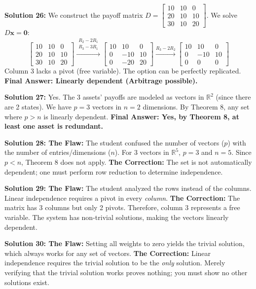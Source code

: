 \documentclass[12pt]{article}
\begin{document}
\textbf{Solution 26:} We construct the payoff matrix $D = \begin{bmatrix} 10 & 10 & 0 \\ 20 & 10 & 10 \\ 30 & 10 & 20 \end{bmatrix}$. We solve $D\mathbf{x} = \mathbf{0}$:
$$ \begin{bmatrix} 10 & 10 & 0 \\ 20 & 10 & 10 \\ 30 & 10 & 20 \end{bmatrix} \xrightarrow{\substack{R_2 - 2R_1 \\ R_3 - 3R_1}} \begin{bmatrix} 10 & 10 & 0 \\ 0 & -10 & 10 \\ 0 & -20 & 20 \end{bmatrix} \xrightarrow{R_3 - 2R_2} \begin{bmatrix} 10 & 10 & 0 \\ 0 & -10 & 10 \\ 0 & 0 & 0 \end{bmatrix} $$
Column 3 lacks a pivot (free variable). The option can be perfectly replicated. \textbf{Final Answer: Linearly dependent (Arbitrage possible).}

\textbf{Solution 27:} Yes. The 3 assets' payoffs are modeled as vectors in $\mathbb{R}^2$ (since there are 2 states). We have $p = 3$ vectors in $n = 2$ dimensions. By Theorem 8, any set where $p > n$ is linearly dependent. \textbf{Final Answer: Yes, by Theorem 8, at least one asset is redundant.}

\textbf{Solution 28: The Flaw:} The student confused the number of vectors ($p$) with the number of entries/dimensions ($n$). For 3 vectors in $\mathbb{R}^5$, $p=3$ and $n=5$. Since $p < n$, Theorem 8 does not apply. \textbf{The Correction:} The set is not automatically dependent; one must perform row reduction to determine independence.

\textbf{Solution 29: The Flaw:} The student analyzed the rows instead of the columns. Linear independence requires a pivot in every \textit{column}. \textbf{The Correction:} The matrix has 3 columns but only 2 pivots. Therefore, column 3 represents a free variable. The system has non-trivial solutions, making the vectors linearly dependent.

\textbf{Solution 30: The Flaw:} Setting all weights to zero yields the trivial solution, which always works for any set of vectors. \textbf{The Correction:} Linear independence requires the trivial solution to be the \textit{only} solution. Merely verifying that the trivial solution works proves nothing; you must show no other solutions exist.
\end{document}
